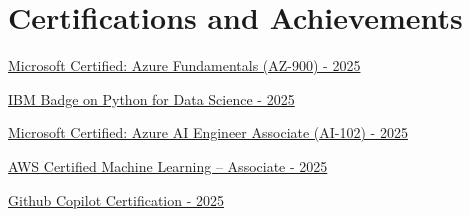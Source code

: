 \documentclass[a4paper,10pt]{article}
\begin{document}
\section{Certifications and Achievements}
\begin{description}[font=$\bullet$]

\item \href{https://www.credly.com/badges/3d70fadc-f715-4d1e-9e05-8dc33add228d/public_url}{Microsoft Certified: Azure Fundamentals (AZ-900) - 2025}

\vspace{-5pt}
\item \href{https://www.credly.com/badges/9f9ac523-007d-4aa2-86b6-7b15201c7d10/public_url}{IBM Badge on Python for Data Science - 2025}
\vspace{-5pt}

\item \href{https://learn.microsoft.com/api/credentials/share/en-us/PavanKalyanBudamacharla-1670/B4B46D14B66E44F2?sharingId=BAAB68093C4388C}{Microsoft Certified: Azure AI Engineer Associate (AI-102) - 2025}

\vspace{-5pt}
\item \href{https://www.credly.com/badges/acbd5f6e-477d-4559-9a8a-0e7a99a385cf/public_url}{AWS Certified Machine Learning – Associate - 2025}

\vspace{-5pt}

\item \href{https://www.credly.com/badges/24c299f9-624d-4dd9-bb2b-c28fd136c05f/public_url} {Github Copilot Certification - 2025}
\end{description}

\vspace{-5pt}
\end{document}
